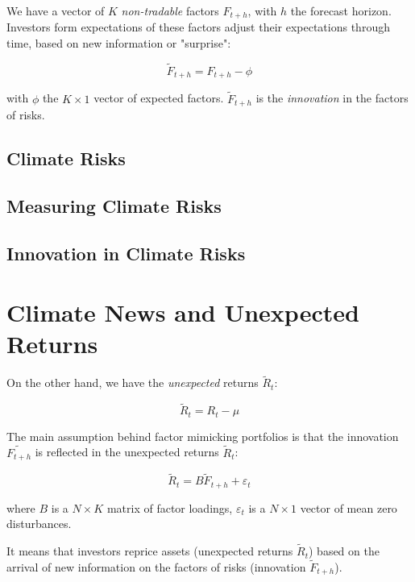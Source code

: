 We have a vector of $K$ \textit{non-tradable} factors $F_{t+h}$, with $h$ the 
forecast horizon. 
Investors form expectations of these factors 
adjust their expectations through time, based on new information or 
"surprise":

\begin{equation}
    \tilde{F}_{t+h} = F_{t+h} - \phi
\end{equation}

with $\phi$ the $K \times 1$ vector of expected factors.
$\tilde{F}_{t+h}$ is the \textit{innovation} in the factors of risks.


\subsection{Climate Risks}

\subsection{Measuring Climate Risks}

\subsection{Innovation in Climate Risks}



\section{Climate News and Unexpected Returns}

On the other hand, we have the \textit{unexpected} returns $\tilde{R}_t$:

\begin{equation}
    \tilde{R}_t = R_t - \mu
\end{equation}

The main assumption behind factor mimicking portfolios is that the innovation 
$\tilde{F_{t+h}}$ is reflected in the unexpected returns $\tilde{R}_t$:

\begin{equation}
    \tilde{R}_t = B \tilde{F}_{t+h} + \varepsilon_t
\end{equation}
    
where $B$ is a $N \times K$ matrix of factor loadings, $\varepsilon_t$ is a $N \times 1$ vector of mean zero disturbances.

It means that investors reprice assets (unexpected returns $\tilde{R}_t$) based on the arrival of new information on the factors of risks (innovation $\tilde{F}_{t+h}$).


